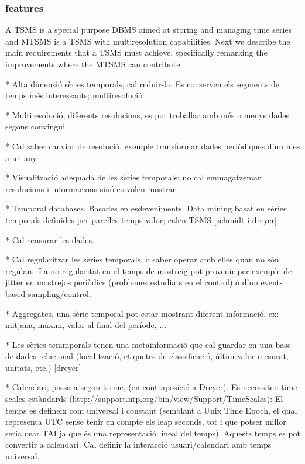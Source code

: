 \subsubsection{features}

A TSMS is a special purpose DBMS aimed at storing and managing time
series and MTSMS is a TSMS with multiresolution capabilities. Next we
describe the main requirements that a TSMS must achieve, specifically
remarking the improvements where the MTSMS can contribute.



* Alta dimensió sèries temporals, cal reduir-la. Es conserven els segments de temps més interessants; multiresolució


* Multiresolució, diferents resolucions, es pot treballar amb més o menys dades segons convingui

* Cal saber canviar de resolució, exemple transformar dades periòdiques d'un mes a un any.

* Visualització adequada de les sèries temporals: no cal emmagatzemar resolucions i informacions sinó es volen mostrar


* Temporal databases. Basades en esdeveniments. Data mining basat en sèries temporals definides per parelles temps-valor; calen TSMS [schmidt i dreyer] 



* Cal censurar les dades.

* Cal regularitzar les sèries temporals, o saber operar amb elles quan no són regulars. La no regularitat en el temps de mostreig pot provenir per exemple de jitter en mostrejos periòdics (problemes estudiats en el control) o d'un event-based sampling/control.


* Aggregates, una sèrie temporal pot estar mostrant diferent informació. ex: mitjana, màxim, valor al final del període, ...

* Les sèries temmporals tenen una metainformació que cal guardar en una base de dades relacional (localització, etiquetes de classificació, últim valor mesurat, unitats, etc.) [dreyer]



* Calendari, passa a segon terme, (en contraposició a Dreyer). Es necessiten time scales estàndards (http://support.ntp.org/bin/view/Support/TimeScales): El temps es defineix com universal i constant (semblant a Unix Time Epoch, el qual representa UTC sense tenir en compte els leap seconds, tot i que potser millor seria usar TAI ja que és una representació lineal del temps). Aquests temps es pot convertir a calendari. Cal definir la interacció usuari/calendari amb temps universal.

